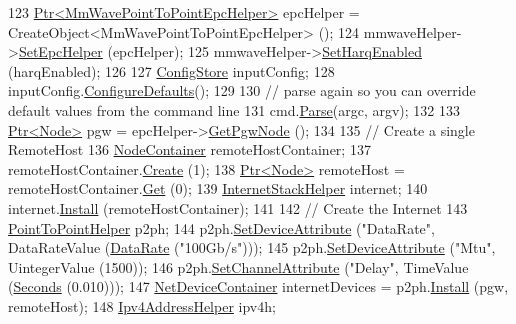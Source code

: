 \begin{DoxyCode}
123   \hyperlink{classns3_1_1Ptr}{Ptr<MmWavePointToPointEpcHelper>}  epcHelper = 
      CreateObject<MmWavePointToPointEpcHelper> ();
124   mmwaveHelper->\hyperlink{classns3_1_1MmWaveHelper_a54fc98a649a710153b479d0878558733}{SetEpcHelper} (epcHelper);
125         mmwaveHelper->\hyperlink{classns3_1_1MmWaveHelper_af211a02952ab5f4eabe0219cf53e7e1c}{SetHarqEnabled} (harqEnabled);
126 
127   \hyperlink{classns3_1_1ConfigStore}{ConfigStore} inputConfig;
128   inputConfig.\hyperlink{classns3_1_1ConfigStore_a0a6137574d7c847c3823af8b9d1bb886}{ConfigureDefaults}();
129 
130   \textcolor{comment}{// parse again so you can override default values from the command line}
131   cmd.\hyperlink{classns3_1_1CommandLine_a5c10b85b3207e5ecb48d907966923156}{Parse}(argc, argv);
132 
133   \hyperlink{classns3_1_1Ptr}{Ptr<Node>} pgw = epcHelper->\hyperlink{classns3_1_1MmWavePointToPointEpcHelper_a586f072ee5b09376531ba605b3fed05f}{GetPgwNode} ();
134 
135    \textcolor{comment}{// Create a single RemoteHost}
136   \hyperlink{classns3_1_1NodeContainer}{NodeContainer} remoteHostContainer;
137   remoteHostContainer.\hyperlink{classns3_1_1NodeContainer_a787f059e2813e8b951cc6914d11dfe69}{Create} (1);
138   \hyperlink{classns3_1_1Ptr}{Ptr<Node>} remoteHost = remoteHostContainer.\hyperlink{classns3_1_1NodeContainer_a9ed96e2ecc22e0f5a3d4842eb9bf90bf}{Get} (0);
139   \hyperlink{classns3_1_1InternetStackHelper}{InternetStackHelper} internet;
140   internet.\hyperlink{classns3_1_1InternetStackHelper_a6645b412f31283d2d9bc3d8a95cebbc0}{Install} (remoteHostContainer);
141 
142   \textcolor{comment}{// Create the Internet}
143   \hyperlink{classns3_1_1PointToPointHelper}{PointToPointHelper} p2ph;
144   p2ph.\hyperlink{classns3_1_1PointToPointHelper_a4577f5ab8c387e5528af2e0fbab1152e}{SetDeviceAttribute} (\textcolor{stringliteral}{"DataRate"}, DataRateValue (\hyperlink{classns3_1_1DataRate}{DataRate} (\textcolor{stringliteral}{"100Gb/s"})));
145   p2ph.\hyperlink{classns3_1_1PointToPointHelper_a4577f5ab8c387e5528af2e0fbab1152e}{SetDeviceAttribute} (\textcolor{stringliteral}{"Mtu"}, UintegerValue (1500));
146   p2ph.\hyperlink{classns3_1_1PointToPointHelper_a6b5317fd17fb61e5a53f8d66a90b63b9}{SetChannelAttribute} (\textcolor{stringliteral}{"Delay"}, TimeValue (\hyperlink{group__timecivil_ga33c34b816f8ff6628e33d5c8e9713b9e}{Seconds} (0.010)));
147   \hyperlink{classns3_1_1NetDeviceContainer}{NetDeviceContainer} internetDevices = p2ph.\hyperlink{classns3_1_1PointToPointHelper_ab9162fea3e88722666fed1106df1f9ec}{Install} (pgw, remoteHost);
148   \hyperlink{classns3_1_1Ipv4AddressHelper}{Ipv4AddressHelper} ipv4h;

\end{DoxyCode}
